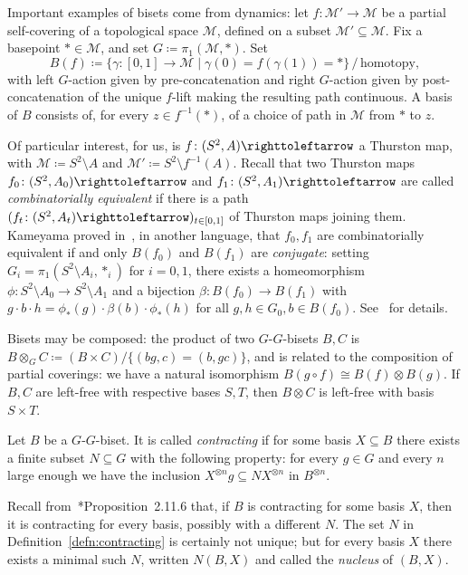 \documentclass{amsart}
\begin{document}
Important examples of bisets come from dynamics: let
$f\colon\mathcal M'\to \mathcal M$ be a partial self-covering of a
topological space $\mathcal M$, defined on a subset
$\mathcal M'\subseteq\mathcal M$. Fix a basepoint $*\in\mathcal M$,
and set $G\coloneqq\pi_1(\mathcal M,*)$. Set
\begin{equation}\label{eq:B(f)}
  B(f)\coloneqq\{\gamma\colon[0,1]\to\mathcal M\mid \gamma(0)=f(\gamma(1))=*\}\,/\,\text{homotopy},
\end{equation}
with left $G$-action given by pre-concatenation and right $G$-action
given by post-concatenation of the unique $f$-lift making the
resulting path continuous. A basis of $B$ consists of, for every
$z\in f^{-1}(*)$, of a choice of path in $\mathcal M$ from $*$ to
$z$.

Of particular interest, for us, is $f\colon(S^2,A)\selfmap$ a Thurston
map, with $\mathcal M\coloneqq S^2\setminus A$ and
$\mathcal M'\coloneqq S^2\setminus f^{-1}(A)$.  Recall that two
Thurston maps $f_0\colon(S^2,A_0)\selfmap$ and
$f_1\colon(S^2,A_1)\selfmap$ are called \emph{combinatorially
  equivalent} if there is a path
$(f_t\colon(S^2,A_t)\selfmap)_{t\in[0,1]}$ of Thurston maps joining
them. Kameyama proved in~\cite{kameyama:thurston}, in another
language, that $f_0,f_1$ are combinatorially equivalent if and only
$B(f_0)$ and $B(f_1)$ are \emph{conjugate}: setting
$G_i=\pi_1(S^2\setminus A_i,*_i)$ for $i=0,1$, there exists a
homeomorphism $\phi\colon S^2\setminus A_0\to S^2\setminus A_1$ and a
bijection $\beta\colon B(f_0)\to B(f_1)$ with
$g\cdot b\cdot h=\phi_*(g)\cdot \beta(b)\cdot\phi_*(h)$ for all
$g,h\in G_0,b\in B(f_0)$. See~\cite{bartholdi-dudko:bc2} for details.

Bisets may be composed: the product of two $G$-$G$-bisets $B,C$ is
$B\otimes_G C\coloneqq (B\times C)/\{(b g,c)=(b,g c)\}$, and is related
to the composition of partial coverings: we have a natural isomorphism
$B(g\circ f)\cong B(f)\otimes B(g)$. If $B,C$ are left-free with
respective bases $S,T$, then $B\otimes C$ is left-free with basis
$S\times T$.

\begin{defn}\label{defn:contracting}
  Let $B$ be a $G$-$G$-biset. It is called \emph{contracting} if for
  some basis $X\subseteq B$ there exists a finite subset
  $N\subseteq G$ with the following property: for every $g\in G$ and
  every $n$ large enough we have the inclusion
  $X^{\otimes n}g\subseteq N X^{\otimes n}$ in $B^{\otimes n}$.
\end{defn}
Recall from~\cite{nekrashevych:ssg}*{Proposition~2.11.6} that, if $B$
is contracting for some basis $X$, then it is contracting for every
basis, possibly with a different $N$.  The set $N$ in
Definition~\ref{defn:contracting} is certainly not unique; but for
every basis $X$ there exists a minimal such $N$, written $N(B,X)$ and
called the \emph{nucleus} of $(B,X)$.
\end{document}
